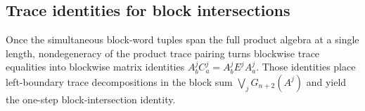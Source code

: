 
\subsection{Trace identities for block intersections}\label{subsec:block_intersection_trace}

Once the simultaneous block-word tuples span the full product algebra at a single
length, nondegeneracy of the product trace pairing turns blockwise trace equalities
into blockwise matrix identities $A^j_bC^j_a=A^j_bE^jA^j_a$. Those identities
place left-boundary trace decompositions in the block sum
$\bigvee_jG_{n+2}(A^j)$ and yield the one-step block-intersection identity.




